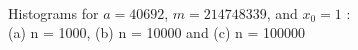 \documentclass[11pt]{article}
\begin{document}
\begin{figure}[H]
  \centering
  \captionsetup{justification=centering}
  \hspace{10mm}
  \\
    \caption{Histograms for $a = 40692$, $m = 214748339$, and $x_{0} = 1$ :\\(a) n = 1000, (b) n = 10000 and (c) n = 100000}
\end{figure}
\end{document}
